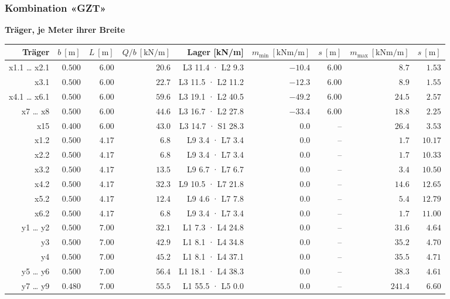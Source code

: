 \documentclass[11pt,a4paper]{article}
\begin{document}
\subsubsection{Kombination «GZT»}
\noindent\textbf{Träger, je Meter ihrer Breite}
\begin{longtable}{rrrrrrrrr}
\hline
Träger & $b\ [\mathrm{m}]$ & $L\ [\mathrm{m}]$ & $Q/b\ [\mathrm{kN/m}]$ & Lager [kN/m] & $m_{\min}\ [\mathrm{kNm/m}]$ & $s\ [\mathrm{m}]$ & $m_{\max}\ [\mathrm{kNm/m}]$ & $s\ [\mathrm{m}]$ \\
\hline
\endhead
x1.1 … x2.1 & $0.500$ & $6.00$ & $20.6$ & L3 11.4 · L2 9.3 & $-10.4$ & $6.00$ & $8.7$ & $1.53$ \\
x3.1 & $0.500$ & $6.00$ & $22.7$ & L3 11.5 · L2 11.2 & $-12.3$ & $6.00$ & $8.9$ & $1.55$ \\
x4.1 … x6.1 & $0.500$ & $6.00$ & $59.6$ & L3 19.1 · L2 40.5 & $-49.2$ & $6.00$ & $24.5$ & $2.57$ \\
x7 … x8 & $0.500$ & $6.00$ & $44.6$ & L3 16.7 · L2 27.8 & $-33.4$ & $6.00$ & $18.8$ & $2.25$ \\
x15 & $0.400$ & $6.00$ & $43.0$ & L3 14.7 · S1 28.3 & $0.0$ & – & $26.4$ & $3.53$ \\
x1.2 & $0.500$ & $4.17$ & $6.8$ & L9 3.4 · L7 3.4 & $0.0$ & – & $1.7$ & $10.17$ \\
x2.2 & $0.500$ & $4.17$ & $6.8$ & L9 3.4 · L7 3.4 & $0.0$ & – & $1.7$ & $10.33$ \\
x3.2 & $0.500$ & $4.17$ & $13.5$ & L9 6.7 · L7 6.7 & $0.0$ & – & $3.4$ & $10.50$ \\
x4.2 & $0.500$ & $4.17$ & $32.3$ & L9 10.5 · L7 21.8 & $0.0$ & – & $14.6$ & $12.65$ \\
x5.2 & $0.500$ & $4.17$ & $12.4$ & L9 4.6 · L7 7.8 & $0.0$ & – & $5.4$ & $12.79$ \\
x6.2 & $0.500$ & $4.17$ & $6.8$ & L9 3.4 · L7 3.4 & $0.0$ & – & $1.7$ & $11.00$ \\
y1 … y2 & $0.500$ & $7.00$ & $32.1$ & L1 7.3 · L4 24.8 & $0.0$ & – & $31.6$ & $4.64$ \\
y3 & $0.500$ & $7.00$ & $42.9$ & L1 8.1 · L4 34.8 & $0.0$ & – & $35.2$ & $4.70$ \\
y4 & $0.500$ & $7.00$ & $45.2$ & L1 8.1 · L4 37.1 & $0.0$ & – & $35.5$ & $4.71$ \\
y5 … y6 & $0.500$ & $7.00$ & $56.4$ & L1 18.1 · L4 38.3 & $0.0$ & – & $38.3$ & $4.61$ \\
y7 … y9 & $0.480$ & $7.00$ & $55.5$ & L1 55.5 · L5 0.0 & $0.0$ & – & $241.4$ & $6.60$ \\

\end{longtable}
\end{document}

